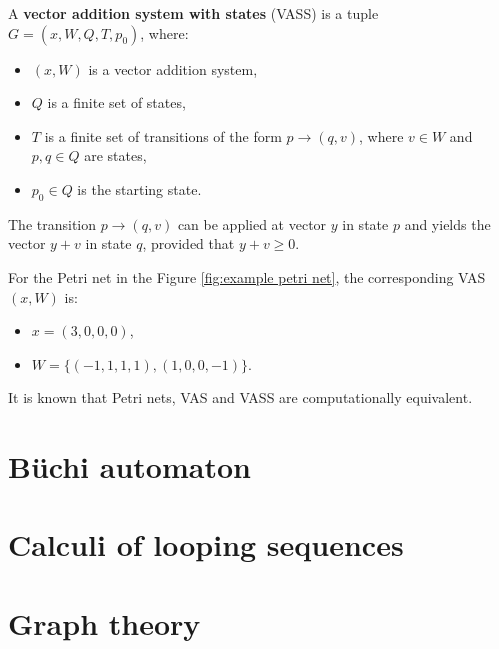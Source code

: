 \begin{definition}
  A {\bf vector addition system with states} (VASS) is a tuple $G = (x, W, Q, T, p_0)$, where:
  \begin{itemize}
    \item $(x, W)$ is a vector addition system,
    \item $Q$ is a finite set of states,
    \item $T$ is a finite set of transitions of the form $p\rightarrow(q,v)$, where $v\in W$ and $p,q\in Q$ are states,
    \item $p_0\in Q$ is the starting state.
  \end{itemize}
\end{definition}

The transition $p\rightarrow(q,v)$ can be applied at vector $y$ in state $p$ and yields the vector $y+v$ in state $q$, provided that $y+v\geq 0$.

\begin{example}
  For the Petri net in the Figure \ref{fig:example petri net}, the corresponding VAS $(x,W)$ is:
  \begin{itemize}
    \item $x=(3,0,0,0)$,
    \item $W=\{(-1,1,1,1),(1,0,0,-1)\}$.
  \end{itemize}
\end{example}

It is known \cite{Hack74PetriVAS} that Petri nets, VAS and VASS are computationally equivalent.


\section{Büchi automaton} %
\label{sec:buchi_automaton}


\section{Calculi of looping sequences} %
\label{sec:calculi_of_looping_sequences}


\section{Graph theory} %
\label{sec:graph_theory}

